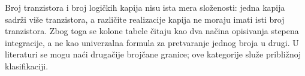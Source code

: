 
Broj tranzistora i broj logičkih kapija nisu ista mera složenosti: jedna kapija sadrži više tranzistora, a različite realizacije kapija ne moraju imati isti broj tranzistora. Zbog toga se kolone tabele čitaju kao dva načina opisivanja stepena integracije, a ne kao univerzalna formula za pretvaranje jednog broja u drugi. U literaturi se mogu naći drugačije brojčane granice; ove kategorije služe približnoj klasifikaciji.
